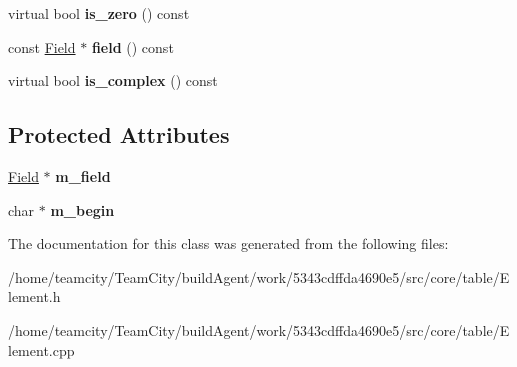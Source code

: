 \begin{DoxyCompactItemize}
\item 
virtual bool {\bfseries is\+\_\+zero} () const \hypertarget{classElement_a5ae575a558cb9d1047a6673cefe4daaa}{}\label{classElement_a5ae575a558cb9d1047a6673cefe4daaa}

\item 
const \hyperlink{classField}{Field} $\ast$ {\bfseries field} () const \hypertarget{classElement_ae9d675372592fc556c8a8ed83b81040b}{}\label{classElement_ae9d675372592fc556c8a8ed83b81040b}

\item 
virtual bool {\bfseries is\+\_\+complex} () const \hypertarget{classElement_a311d28ffc677c6cbb7f5383af8dcccf0}{}\label{classElement_a311d28ffc677c6cbb7f5383af8dcccf0}

\end{DoxyCompactItemize}
\subsection*{Protected Attributes}
\begin{DoxyCompactItemize}
\item 
\hyperlink{classField}{Field} $\ast$ {\bfseries m\+\_\+field}\hypertarget{classElement_a32be443e21537c376e41c61a1f3fe302}{}\label{classElement_a32be443e21537c376e41c61a1f3fe302}

\item 
char $\ast$ {\bfseries m\+\_\+begin}\hypertarget{classElement_a43e5c2622b57e837a71fed98190d970a}{}\label{classElement_a43e5c2622b57e837a71fed98190d970a}

\end{DoxyCompactItemize}


The documentation for this class was generated from the following files\+:\begin{DoxyCompactItemize}
\item 
/home/teamcity/\+Team\+City/build\+Agent/work/5343cdffda4690e5/src/core/table/Element.\+h\item 
/home/teamcity/\+Team\+City/build\+Agent/work/5343cdffda4690e5/src/core/table/Element.\+cpp\end{DoxyCompactItemize}
